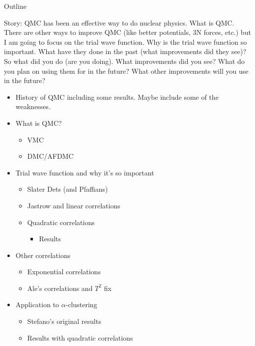 \documentclass{beamer}
\newcommand{\sfont}{6}
\newcommand{\sspace}{10.2}
\begin{document}
\begin{frame}{Outline}

{\tiny Story: QMC has been an effective way to do nuclear physics. What is QMC. There are other ways to improve QMC (like better potentials, 3N forces, etc.) but I am going to focus on the trial wave function. Why is the trial wave function so important. What have they done in the past (what improvements did they see)? So what did you do (are you doing). What improvements did you see? What do you plan on using them for in the future? What other improvements will you use in the future?
\begin{itemize}
   \item History of QMC including some results. Maybe include some of the weaknesses.
   \item What is QMC?
   \begin{itemize}\fontsize{\sfont}{\sspace}\selectfont
      \item VMC
      \item DMC/AFDMC
   \end{itemize}
   \item Trial wave function and why it's so important
   \begin{itemize}\fontsize{\sfont}{\sspace}\selectfont
      \item Slater Dets (and Pfaffians)
      \item Jastrow and linear correlations
      \item Quadratic correlations
      \begin{itemize}\fontsize{\sfont}{\sspace}\selectfont
         \item Results
      \end{itemize}
   \end{itemize}
   \item Other correlations
   \begin{itemize}\fontsize{\sfont}{\sspace}\selectfont
      \item Exponential correlations
      \item Ale's correlations and $T^2$ fix
   \end{itemize}
   \item Application to $\alpha$-clustering
   \begin{itemize}\fontsize{\sfont}{\sspace}\selectfont
      \item Stefano's original results
      \item Results with quadratic correlations
   \end{itemize}
\end{itemize}}
\end{frame}
\end{document}
